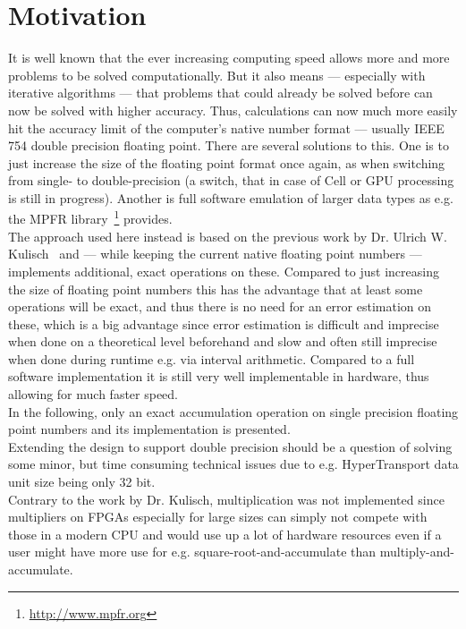 
\chapter{Motivation}
It is well known that the ever increasing computing speed allows more
and more problems to be solved computationally.
But it also means --- especially with iterative algorithms --- that problems
that could already be solved before can now be solved with higher accuracy.
Thus, calculations can now much more easily hit the accuracy limit of the
computer's native number format --- usually IEEE 754 double precision floating
point.
There are several solutions to this. One is to just increase the size of the
floating point format once again, as when switching from single- to
double-precision (a switch, that in case of Cell or GPU processing is still in
progress).
Another is full software emulation of larger data types as e.g. the
MPFR library~\footnote{\url{http://www.mpfr.org}} provides.\\
The approach used here instead is based on the previous work by
Dr. Ulrich W. Kulisch~\cite{advar} and --- while keeping the current native
floating point numbers --- implements additional, exact operations on these.
Compared to just increasing the size of floating point numbers this has the
advantage that at least some operations will be exact, and thus there is no
need for an error estimation on these, which is a big advantage since error
estimation is difficult and imprecise when done on a theoretical level
beforehand and slow and often still imprecise when done during runtime e.g.
via interval arithmetic.
Compared to a full software implementation it is still very well implementable
in hardware, thus allowing for much faster speed.\\
In the following, only an exact accumulation operation on single precision floating
point numbers and its implementation is presented.\\
Extending the design to support double precision should be a question of solving
some minor, but time consuming technical issues due to e.g. HyperTransport data
unit size being only 32 bit.\\
Contrary to the work by Dr. Kulisch, multiplication was not implemented since
multipliers on FPGAs especially for large sizes can simply not compete with
those in a modern CPU and would use up a lot of hardware resources even if
a user might have more use for e.g. square-root-and-accumulate than
multiply-and-accumulate.

